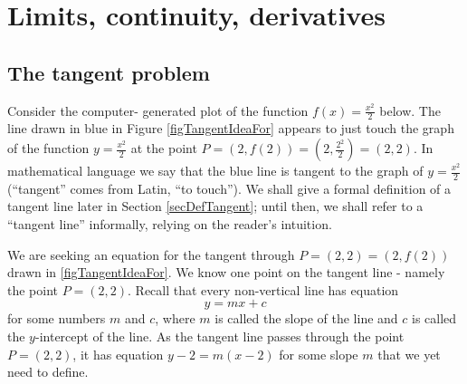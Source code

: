 \documentclass[12pt]{book}
\begin{document}
\chapter{Limits, continuity, derivatives}
\section{The tangent problem}
Consider the computer- generated plot of the function $f(x)=\frac{x^2}2$ below. The line drawn in blue in Figure \ref{figTangentIdeaFor} appears to just touch the graph of the function $y=\frac{x^2}2$ at the point $P=(2,f(2))=(2, \frac{2^2}{2}) =(2,2)$. In mathematical language we say that the blue line is tangent to the graph of $ y=\frac{x^2}2$ (``tangent'' comes from Latin, ``to touch''). We shall give a formal definition of a tangent line later in Section \ref{secDefTangent}; until then, we shall refer to a ``tangent line'' informally, relying on the reader's intuition.

We are seeking an equation for the tangent through $P=(2,2)=(2, f(2))$ drawn in \ref{figTangentIdeaFor}. We know one point on the tangent line - namely the point $P=(2,2)$. Recall that every non-vertical line has equation
\[
y=mx+c
\]
for some numbers $m$ and $c$, where $m$ is called the slope
of the line and $c$ is called the $y$-intercept of the line. As the tangent line passes through the point $P=(2,2)$, it has equation $y-2=m(x-2)$ for some slope $m$ that we yet need to define.
\end{document}
